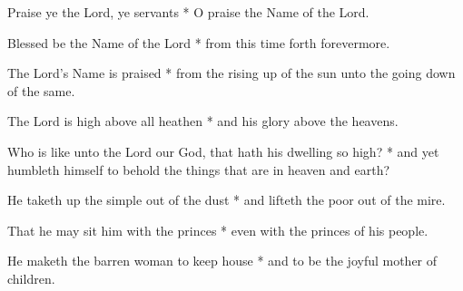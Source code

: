 Praise ye the Lord, ye servants * O praise the Name of the Lord.

Blessed be the Name of the Lord * from this time forth forevermore.
	
The Lord's Name is praised * from the rising up of the sun unto the going down of the same.
	
The Lord is high above all heathen * and his glory above the heavens.
	
Who is like unto the Lord our God, that hath his dwelling so high? * and yet humbleth himself to behold the things that are in heaven and earth?
	
He taketh up the simple out of the dust * and lifteth the poor out of the mire.
	
That he may sit him with the princes * even with the princes of his people.
	
He maketh the barren woman to keep house * and to be the joyful mother of children.
